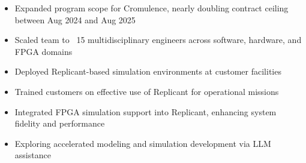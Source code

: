         \begin{itemize}
            \item Expanded program scope for Cromulence, nearly doubling contract ceiling between Aug 2024 and Aug 2025
            \item Scaled team to ~15 multidisciplinary engineers across software, hardware, and FPGA domains
            \item Deployed Replicant-based simulation environments at customer facilities
            \item Trained customers on effective use of Replicant for operational missions
            \item Integrated FPGA simulation support into Replicant, enhancing system fidelity and performance
            \item Exploring accelerated modeling and simulation development via LLM assistance
        \end{itemize}

